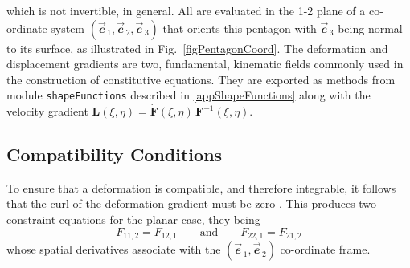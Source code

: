 which is not invertible, in general.  All are evaluated in the 1-2 plane of a co-ordinate system $( \vec{\mathbfit{e}}_{\,1} , \vec{\mathbfit{e}}_{\,2} , \vec{\mathbfit{e}}_{\, 3} )$ that orients this pentagon with $\vec{\mathbfit{e}}_{\,3}$ being normal to its surface, as illustrated in Fig.~\ref{figPentagonCoord}.  The deformation and displacement gradients are two, fundamental, kinematic fields commonly used in the construction of constitutive equations.  They are exported as methods from module \texttt{shapeFunctions} described in \ref{appShapeFunctions} along with the velocity gradient $\mathbf{L} (\xi, \eta) = \dot{\mathbf{F}} (\xi, \eta) \, \mathbf{F}^{-1} (\xi, \eta)$.

\subsection{Compatibility Conditions}

To ensure that a deformation is compatible, and therefore integrable, it follows that the curl of the deformation gradient must be zero \cite{Clayton15}.  This produces two constraint equations for the planar case, they being
\begin{equation}
\label{compatibility}
F_{11,2} = F_{12,1} 
\qquad \text{and} \qquad
F_{22,1} = F_{21,2}
\end{equation}
whose spatial derivatives associate with the $( \vec{\mathbfit{e}}_{\,1} , \vec{\mathbfit{e}}_{\,2} )$ co-ordinate frame.


